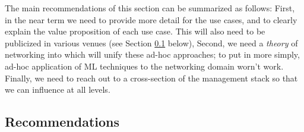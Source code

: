 \documentclass[11pt, oneside]{article}   	%
\begin{document}
\bigskip
\noindent
The main recommendations of this section can be summarized as follows: First, in the near term we need to provide more detail for the use cases, and to clearly explain the value proposition of each use case. This will also need to be publicized in various venues (see Section \ref{sec:recommendations} below), Second, we need a \emph{theory} of networking into which will unify these ad-hoc approaches; to put in more simply, ad-hoc application of ML techniques 
to the networking domain worn't work. Finally, we need to reach out to a cross-section of the 
management stack so that we can influence at all levels.

\subsection{Recommendations}
\label{sec:recommendations}
\end{document}
